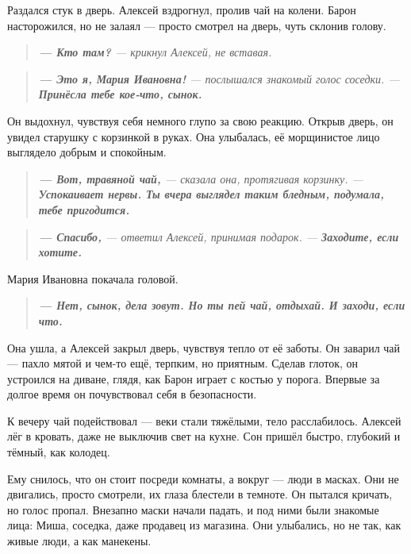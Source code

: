 \documentclass[12pt,a4paper]{book}
\newenvironment{dialogue}{\begin{quote}\itshape}{\end{quote}}
\begin{document}
Раздался стук в дверь. Алексей вздрогнул, пролив чай на колени. Барон насторожился, но не залаял --- просто смотрел на дверь, чуть склонив голову.

\begin{dialogue}
\textbf{--- Кто там?} --- крикнул Алексей, не вставая.
\end{dialogue}

\begin{dialogue}
\textbf{--- Это я, Мария Ивановна!} --- послышался знакомый голос соседки. --- \textbf{Принёсла тебе кое-что, сынок.}
\end{dialogue}

Он выдохнул, чувствуя себя немного глупо за свою реакцию. Открыв дверь, он увидел старушку с корзинкой в руках. Она улыбалась, её морщинистое лицо выглядело добрым и спокойным.

\begin{dialogue}
\textbf{--- Вот, травяной чай,} --- сказала она, протягивая корзинку. --- \textbf{Успокаивает нервы. Ты вчера выглядел таким бледным, подумала, тебе пригодится.}
\end{dialogue}

\begin{dialogue}
\textbf{--- Спасибо,} --- ответил Алексей, принимая подарок. --- \textbf{Заходите, если хотите.}
\end{dialogue}

Мария Ивановна покачала головой.

\begin{dialogue}
\textbf{--- Нет, сынок, дела зовут. Но ты пей чай, отдыхай. И заходи, если что.}
\end{dialogue}

Она ушла, а Алексей закрыл дверь, чувствуя тепло от её заботы. Он заварил чай --- пахло мятой и чем-то ещё, терпким, но приятным. Сделав глоток, он устроился на диване, глядя, как Барон играет с костью у порога. Впервые за долгое время он почувствовал себя в безопасности.

К вечеру чай подействовал --- веки стали тяжёлыми, тело расслабилось. Алексей лёг в кровать, даже не выключив свет на кухне. Сон пришёл быстро, глубокий и тёмный, как колодец.

Ему снилось, что он стоит посреди комнаты, а вокруг --- люди в масках. Они не двигались, просто смотрели, их глаза блестели в темноте. Он пытался кричать, но голос пропал. Внезапно маски начали падать, и под ними были знакомые лица: Миша, соседка, даже продавец из магазина. Они улыбались, но не так, как живые люди, а как манекены.
\end{document}
